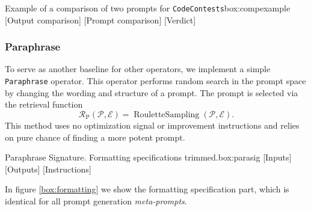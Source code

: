 \begin{figurebox}{Example of a comparison of two prompts for \texttt{CodeContests}}{box:compexample}
    {
        [Output comparison]
        [Prompt comparison]
        [Verdict]
    }
\end{figurebox}

\subsubsection{Paraphrase}
To serve as another baseline for other operators, we implement a simple \texttt{Paraphrase} operator.
This operator performs random search in the prompt space by changing the wording and structure of a prompt.
The prompt is selected via the retrieval function
\begin{equation}
    \mathcal{R}_{\text{P}}(\mathscr{P}, \mathcal{E}) = \operatorname{RouletteSampling}(\mathscr{P}, \mathcal{E}).
\end{equation}
This method uses no optimization signal or improvement instructions and relies on pure chance of finding a more potent prompt.


\begin{figurebox}{Paraphrase Signature. Formatting specifications trimmed.}{box:parasig}
    [Inputs]
    [Outputs]
    [Instructions]
\end{figurebox}
In figure \ref{box:formatting} we show the formatting specification part, which is identical for all prompt generation \textit{meta-prompts}.

